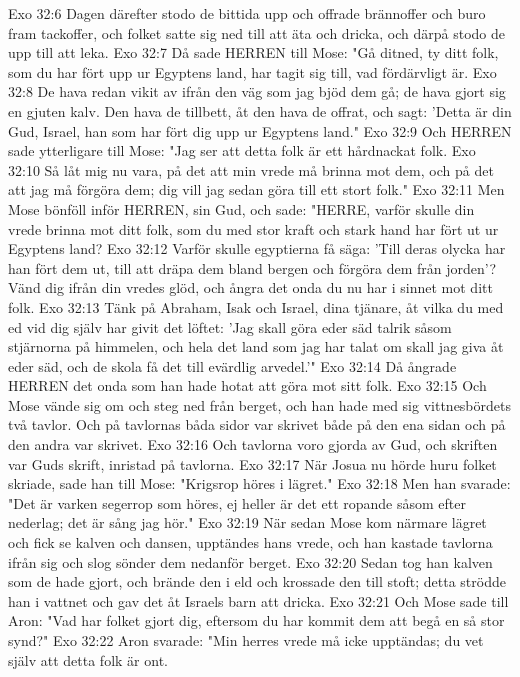 Exo 32:6  Dagen därefter stodo de bittida upp och offrade brännoffer och buro fram tackoffer, och folket satte sig ned till att äta och dricka, och därpå stodo de upp till att leka.
Exo 32:7  Då sade HERREN till Mose: "Gå ditned, ty ditt folk, som du har fört upp ur Egyptens land, har tagit sig till, vad fördärvligt är.
Exo 32:8  De hava redan vikit av ifrån den väg som jag bjöd dem gå; de hava gjort sig en gjuten kalv. Den hava de tillbett, åt den hava de offrat, och sagt: 'Detta är din Gud, Israel, han som har fört dig upp ur Egyptens land."
Exo 32:9  Och HERREN sade ytterligare till Mose: "Jag ser att detta folk är ett hårdnackat folk.
Exo 32:10  Så låt mig nu vara, på det att min vrede må brinna mot dem, och på det att jag må förgöra dem; dig vill jag sedan göra till ett stort folk."
Exo 32:11  Men Mose bönföll inför HERREN, sin Gud, och sade: "HERRE, varför skulle din vrede brinna mot ditt folk, som du med stor kraft och stark hand har fört ut ur Egyptens land?
Exo 32:12  Varför skulle egyptierna få säga: 'Till deras olycka har han fört dem ut, till att dräpa dem bland bergen och förgöra dem från jorden'? Vänd dig ifrån din vredes glöd, och ångra det onda du nu har i sinnet mot ditt folk.
Exo 32:13  Tänk på Abraham, Isak och Israel, dina tjänare, åt vilka du med ed vid dig själv har givit det löftet: 'Jag skall göra eder säd talrik såsom stjärnorna på himmelen, och hela det land som jag har talat om skall jag giva åt eder säd, och de skola få det till evärdlig arvedel.'"
Exo 32:14  Då ångrade HERREN det onda som han hade hotat att göra mot sitt folk.
Exo 32:15  Och Mose vände sig om och steg ned från berget, och han hade med sig vittnesbördets två tavlor. Och på tavlornas båda sidor var skrivet både på den ena sidan och på den andra var skrivet.
Exo 32:16  Och tavlorna voro gjorda av Gud, och skriften var Guds skrift, inristad på tavlorna.
Exo 32:17  När Josua nu hörde huru folket skriade, sade han till Mose: "Krigsrop höres i lägret."
Exo 32:18  Men han svarade: "Det är varken segerrop som höres, ej heller är det ett ropande såsom efter nederlag; det är sång jag hör."
Exo 32:19  När sedan Mose kom närmare lägret och fick se kalven och dansen, upptändes hans vrede, och han kastade tavlorna ifrån sig och slog sönder dem nedanför berget.
Exo 32:20  Sedan tog han kalven som de hade gjort, och brände den i eld och krossade den till stoft; detta strödde han i vattnet och gav det åt Israels barn att dricka.
Exo 32:21  Och Mose sade till Aron: "Vad har folket gjort dig, eftersom du har kommit dem att begå en så stor synd?"
Exo 32:22  Aron svarade: "Min herres vrede må icke upptändas; du vet själv att detta folk är ont.
